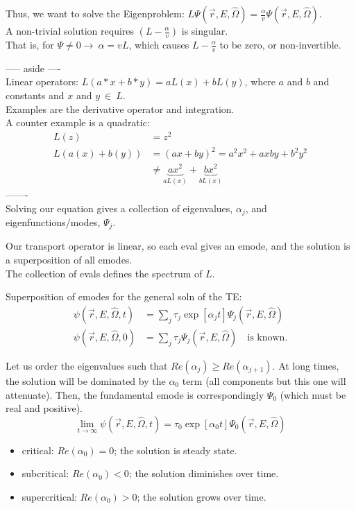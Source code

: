 \documentclass[12pt]{article}
\newcommand{\rvec}{\ensuremath{\vec{r}}}
\newcommand{\vOmega}{\ensuremath{\hat{\Omega}}}
\begin{document}
Thus, we want to solve the Eigenproblem: $L\Psi(\rvec, E, \vOmega) = \frac{\alpha}{v}\Psi(\rvec, E, \vOmega)$.\\
A non-trivial solution requires $(L - \frac{\alpha}{v})$ is singular. \\
That is, for $\Psi \neq 0 \rightarrow \: \alpha = v L$, which causes $L - \frac{\alpha}{v}$ to be zero, or non-invertible.


----- aside ----\\
Linear operators: $L(a*x + b*y) = aL(x) + bL(y)$, where $a$ and $b$ and constants and $x$ and $y \: \in \: L$.\\
Examples are the derivative operator and integration. \\
A counter example is a quadratic:
\begin{align*}
L(z) &= z^2 \\
L(a(x) + b(y)) &= (ax + by)^2 = a^2 x^2 + axby + b^2 y^2 \\
& \neq \underbrace{a x^2}_{aL(x)} + \underbrace{b x^2}_{bL(x)}
\end{align*}
-------\\
Solving our equation gives a collection of eigenvalues, $\alpha_j$, and eigenfunctions/modes, $\Psi_j$. 

Our transport operator is linear, so each eval gives an emode, and the solution is a superposition of all emodes. \\
The collection of evals defines the spectrum of $L$.

Superposition of emodes for the general soln of the TE:
\begin{align*}
\psi(\rvec, E, \vOmega, t) &= \sum_{j} \tau_j \exp[\alpha_j t] \Psi_j(\rvec, E, \vOmega) \\
\psi(\rvec, E, \vOmega, 0) &= \sum_{j} \tau_j \Psi_j(\rvec, E, \vOmega) \quad \text{is known.}
\end{align*}

Let us order the eigenvalues such that $Re(\alpha_j) \geq Re(\alpha_{j+1})$. At long times, the solution will be dominated by the $\alpha_0$ term (all components but this one will attenuate). Then, the fundamental emode is correspondingly $\Psi_0$ (which must be real and positive).
\[\lim_{t \to \infty} \psi(\rvec, E, \vOmega, t) = \tau_0 \exp[\alpha_0 t] \Psi_0(\rvec, E, \vOmega)\]
%
\begin{itemize}
\item critical: $Re(\alpha_0) = 0$; the solution is steady state. 
\item subcritical: $Re(\alpha_0) < 0$; the solution diminishes over time.
\item supercritical: $Re(\alpha_0) > 0$; the solution grows over time.
\end{itemize} 
%
\end{document}

